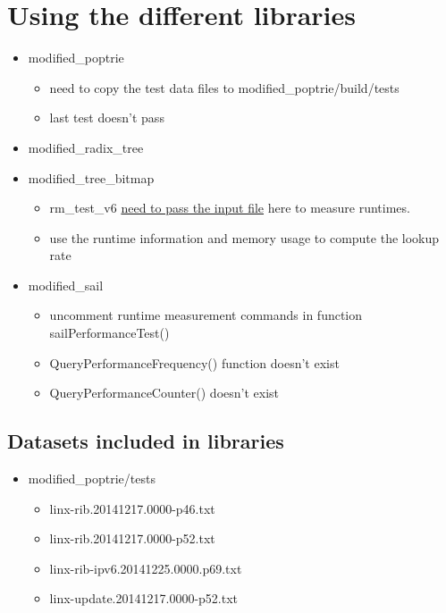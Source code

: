 \documentclass{article}
\begin{document}
\section{Using the different libraries}
\begin{itemize}
    \item modified\_poptrie
    \begin{itemize}
        \item need to copy the test data files to modified\_poptrie/build/tests
        \item last test doesn't pass
    \end{itemize}
    \item modified\_radix\_tree
    \item modified\_tree\_bitmap
    \begin{itemize}
        \item rm\_test\_v6 \underline{need to pass the input file} here to measure runtimes.
        \item use the runtime information and memory usage to compute the lookup rate
    \end{itemize}
    \item modified\_sail
    \begin{itemize}
        \item uncomment runtime measurement commands in function sailPerformanceTest()
        \item QueryPerformanceFrequency() function doesn't exist
        \item QueryPerformanceCounter() doesn't exist
    \end{itemize}
\end{itemize}

\subsection{Datasets included in libraries}
\begin{itemize}
    \item modified\_poptrie/tests
    \begin{itemize}
        \item linx-rib.20141217.0000-p46.txt
        \item linx-rib.20141217.0000-p52.txt
        \item linx-rib-ipv6.20141225.0000.p69.txt
        \item linx-update.20141217.0000-p52.txt
    \end{itemize}
\end{itemize}
\end{document}
